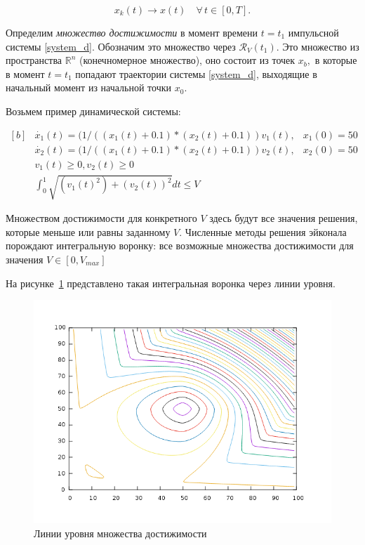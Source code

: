 \documentclass[a4paper,12pt]{article}
\begin{document}
\begin{equation*}
  x_k(t)\to x(t) \quad  \forall \, t\in [0,T].
\end{equation*}

Определим \emph{множество достижимости} в момент  времени $t=t_1$
импульсной системы \eqref{system_d}. Обозначим это множество через 
$ {\mathcal R}_V(t_1)$. Это множество из  пространства ${\mathbb R}^n$
(конечномерное  множество), оно состоит из точек $x_b,$ в  которые в
момент $t=t_1$ попадают траектории  системы \eqref{system_d}, выходящие
в начальный  момент из начальной точки $x_0$.

Возьмем пример динамической системы:

\begin{equation*}
  \begin{aligned}[b]
    &\dot{x_1}(t) = (1/((x_1(t)+0.1) * (x_2(t)+0.1))v_1(t), & x_1(0)=50\\
    &\dot{x_2}(t) = (1/((x_1(t)+0.1) * (x_2(t)+0.1))v_2(t), & x_2(0) = 50\\[8pt]
    &v_1(t) \ge 0, v_2(t) \ge 0 \\
    &\int_{0}^{1} \sqrt{(v_1(t)^2) + (v_2(t))^2} dt \le V
  \end{aligned}
\end{equation*}

Множеством достижимости для конкретного $V$ здесь будут все значения
решения, которые меньше или равны заданному $V$. Численные методы
решения эйконала порождают интегральную воронку: все возможные
множества достижимости для значения $V \in [0,V_{max}]$

На рисунке~\ref{fig:impulse-example-levels} представлено такая
интегральная воронка через линии уровня.

\begin{figure}[H]
  \centering
  \includegraphics[width=0.5\linewidth]{img/impulse-example-levels.png}
  \hfil \caption{Линии уровня множества достижимости}
  \label{fig:impulse-example-levels}
\end{figure}
\end{document}
